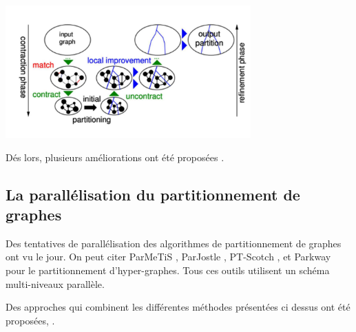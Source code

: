	\begin{center}
		\includegraphics[height=2in]{img/multiniveaupartitionnement.PNG}		
		 \label{pmn}
	\end{center}
Dés lors, plusieurs améliorations ont été proposées \citep{Aurora2007,ChevalierSafro2009,KalayciBattiti2018,Karypis2003,KarypisKumar1998,Monien2000,Pellegrini1995,Pope2016,Predari2017,Safro2015,SandersSchulz2011,Talu2017}.


\subsection*{La parallélisation du partitionnement de graphes}
Des tentatives de parallélisation des algorithmes de partitionnement de graphes ont vu le jour. On peut citer ParMeTiS \citep{Karypis2011}, ParJostle \citep{Walshaw2012}, PT-Scotch \citep{ChevalierPellegrini2008}, et Parkway \citep{TrifunovicKnottenbelt2004} pour le partitionnement d'hyper-graphes. Tous ces outils utilisent un schéma multi-niveaux parallèle.

Des approches qui combinent les différentes méthodes présentées ci dessus ont été proposées, \citep{Chan2016,LaSalleKarypis2013,LaSalleKarypis2015,LengYu2007,Rahimian2013,SandersSchulz2012,Tashkova2011}.


